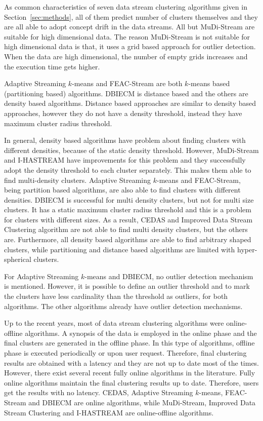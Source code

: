 \documentclass[smallcondensed]{svjour3}     %
\begin{document}
As common characteristics of seven data stream clustering algorithms given in Section~\ref{sec:methods}, all of them predict number of clusters themselves and they are all able to adopt concept drift in the data streams. All but MuDi-Stream are suitable for high dimensional data. The reason MuDi-Stream is not suitable for high dimensional data is that, it uses a grid based approach for outlier detection. When the data are high dimensional, the number of empty grids increases and the execution time gets higher. 

Adaptive Streaming $k$-means and FEAC-Stream are both $k$-means based (partitioning based) algorithms. DBIECM is distance based and the others are density based algorithms. Distance based approaches are similar to density based approaches, however they do not have a density threshold, instead they have maximum cluster radius threshold. 

In general, density based algorithms have problem about finding clusters with different densities, because of the static density threshold. However, MuDi-Stream and I-HASTREAM have improvements for this problem and they successfully adopt the density threshold to each cluster separately. This makes them able to find multi-density clusters. Adaptive Streaming $k$-means and FEAC-Stream, being partition based algorithms, are also able to find clusters with different densities. DBIECM is successful for multi density clusters, but not for multi size clusters. It has a static maximum cluster radius threshold and this is a problem for clusters with different sizes. As a result, CEDAS and Improved Data Stream Clustering algorithm are not able to find multi density clusters, but the others are. Furthermore, all density based algorithms are able to find arbitrary shaped clusters, while partitioning and distance based algorithms are limited with hyper-spherical clusters. 

For Adaptive Streaming $k$-means and DBIECM, no outlier detection mechanism is mentioned. However, it is possible to define an outlier threshold and to mark the clusters have less cardinality than the threshold as outliers, for both algorithms. The other algorithms already have outlier detection mechanisms. 

Up to the recent years, most of data stream clustering algorithms were online-offline algorithms. A synopsis of the data is employed in the online phase and the final clusters are generated in the offline phase. In this type of algorithms, offline phase is executed periodically or upon user request. Therefore, final clustering results are obtained with a latency and they are not up to date most of the times. However, there exist several recent fully online algorithms in the literature. Fully online algorithms maintain the final clustering results up to date. Therefore, users get the results with no latency. CEDAS, Adaptive Streaming $k$-means, FEAC-Stream and DBIECM are online algorithms, while MuDi-Stream, Improved Data Stream Clustering and I-HASTREAM are online-offline algorithms. 
\end{document}
